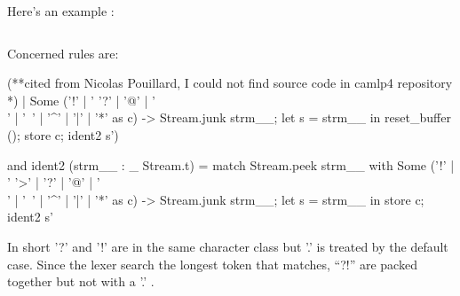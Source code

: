 
Here's an example :

\inputminted[fontsize=\scriptsize, fontsize=\scriptsize, ]{ocaml}{camlp4/code/lexer_test.ml}
Concerned rules are:
\begin{ocamlcode}
(**cited from Nicolas Pouillard, I could not find source code in
  camlp4 repository *)
 | Some
        ('!' | '%
         '?' | '@' | '\\' | '~' | '^' | '|' | '*' as c) ->
        Stream.junk strm__;
        let s = strm__ in reset_buffer (); store c; ident2 s')

and ident2 (strm__ : _ Stream.t) =
    match Stream.peek strm__ with
      Some
        ('!' | '%
         '>' | '?' | '@' | '\\' | '~' | '^' | '|' | '*' as c) ->
        Stream.junk strm__; let s = strm__ in store c; ident2 s'

\end{ocamlcode}

In short '?' and '!' are in the same character class but '.' is
treated by the default case. Since the lexer search the longest token
that matches, ``?!'' are packed together but not with a '.' .
